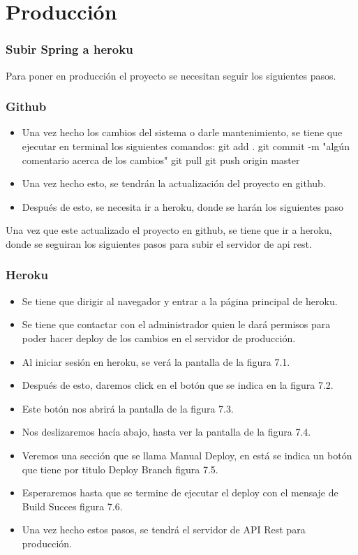 \chapter{Producción}

\subsection{Subir Spring a heroku}

Para poner en producción el proyecto se necesitan seguir los siguientes pasos.

\subsection{Github}
\begin{itemize}
    \item Una vez hecho los cambios del sistema o darle mantenimiento, se tiene que ejecutar en terminal los siguientes comandos: 
    git add .
    git commit -m "algún comentario acerca de los cambios"
    git pull
    git push origin master
    \item Una vez hecho esto, se tendrán la actualización del proyecto en github.
    \item Después de esto, se necesita ir a heroku, donde se harán los siguientes paso 
\end{itemize}
Una vez que este actualizado el proyecto en github, se tiene que ir a heroku, donde se seguiran los siguientes pasos para subir el servidor de api rest.
\subsection{Heroku}
\begin{itemize}
    \item Se tiene que dirigir al navegador y entrar a la página principal de heroku.
    \item Se tiene que contactar con el administrador quien le dará permisos para poder hacer deploy de los cambios en el servidor de producción.
    \item Al iniciar sesión en heroku, se verá la pantalla de la figura 7.1.
    \item Después de esto, daremos click en el botón que se indica en la figura 7.2.
    \item Este botón nos abrirá la pantalla de la figura 7.3.
    \item Nos deslizaremos hacía abajo, hasta ver la pantalla de la figura 7.4.
    \item Veremos una sección que se llama Manual Deploy, en está se indica un botón que tiene por titulo Deploy Branch figura 7.5.
    \item Esperaremos hasta que se termine de ejecutar el deploy con el mensaje de Build Succes figura 7.6.
    \item Una vez hecho estos pasos, se tendrá el servidor de API Rest para producción.
\end{itemize}



